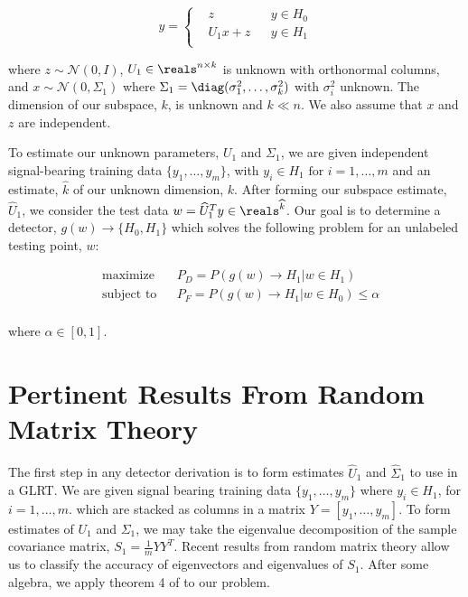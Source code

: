 \begin{equation}\label{eq:prob state}
y=\left\{
\begin{aligned}
&z
&& y\in H_0\\
&U_1x+z
&& y\in H_1\\
\end{aligned}\right.
\end{equation}

where $z\sim\mathcal{N}(0,I)$, $U_1\in\reals^{n\times k}$ is unknown with orthonormal columns, and $x\sim\mathcal{N}(0,\Sigma_1)$ where $\Sigma_1=\diag(\sigma_1^2,\dots,\sigma_k^2)$ with $\sigma_i^2$ unknown. The dimension of our subspace, $k$, is unknown and $k\ll n$. We also assume that $x$ and $z$ are independent.

To estimate our unknown parameters, $U_1$ and $\Sigma_1$, we are given independent signal-bearing training data $\{y_1,\dots,y_m\}$, with $y_i\in H_1 \text{ for } i=1,\dots,m$ and an estimate, $\widehat{k}$ of our unknown dimension, $k$. After forming our subspace estimate, $\widehat{U}_1$,  we consider the test data $w=\widehat{U}_1^Ty\in\reals^{\widehat{k}}$. Our goal is to determine a detector, $g(w)\to\{H_0,H_1\}$ which solves the following problem for an unlabeled testing point, $w$:

\begin{equation}\label{eq:maximization}
\begin{aligned}
&\text{maximize}
&& P_D=P\left(g(w)\to H_1 | w\in H_1\right)\\
&\text{subject to}
&& P_F=P\left(g(w)\to H_1 | w\in H_0\right)\leq\alpha\\
\end{aligned}
\end{equation}

where $\alpha\in[0,1]$.

\section{Pertinent Results From Random Matrix Theory}\label{sec:params}
The first step in any detector derivation is to form estimates $\widehat{U}_1$ and $\widehat{\Sigma}_1$ to use in a GLRT. We are given signal bearing training data $\{y_1,\dots,y_m\}$ where $y_i\in H_1$, for $i=1,\dots,m$. which are stacked as columns in a matrix $Y=[y_1,\dots,y_m]$. To form estimates of $U_1$ and $\Sigma_1$, we may take the eigenvalue decomposition of the sample covariance matrix, $S_1=\frac{1}{m}YY^T$. Recent results from random matrix theory allow us to classify the accuracy of eigenvectors and eigenvalues of $S_1$. After some algebra, we apply theorem 4 of \cite{paul2007asymptotics,asendorf,benaych2011eigenvalues} to our problem.

